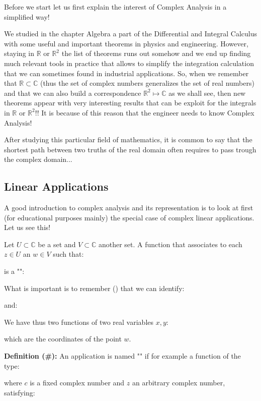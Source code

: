 Before we start let us first explain the interest of Complex Analysis in a simplified way!

We studied in the chapter Algebra a part of the Differential and Integral Calculus with some useful and important theorems in physics and engineering. However, staying in $\mathbb{R}$ or $\mathbb{R}^2$ the list of theorems runs out somehow and we end up finding much relevant tools in practice that allows to simplify the integration calculation that we can sometimes found in industrial applications. So, when we remember that $\mathbb{R} \subset \mathbb{C}$ (thus the set of complex numbers generalizes the set of real numbers) and that we can also build a correspondence $\mathbb{R}^2 \mapsto \mathbb{C}$ as we shall see, then new theorems appear with very interesting results that can be exploit for the integrals in $\mathbb{R}$ or $\mathbb{R}^2$!! It is because of this reason that the engineer needs to know Complex Analysis!

After studying this particular field of mathematics, it is common to say that the shortest path between two truths of the real domain often requires to pass trough the complex domain...

\subsection{Linear Applications}

A good introduction to complex analysis and its representation is to look at first (for educational purposes mainly) the special case of complex linear applications. Let us see this!

Let $U \subset \mathbb{C}$ be a set and $V \subset \mathbb{C}$ another set. A function that associates to each $z \in U$ an $w \in V$ such that:
	
is a "":
	
What is important is to remember () that we can identify:
	
and:
	
We have thus two functions of two real variables $x, y$:
	
which are the coordinates of the point $w$.

\textbf{Definition (\#\mydef):} An application is named "" if for example a function of the type:
	
where $c$ is a fixed complex number and $z$ an arbitrary complex number, satisfying:
	

